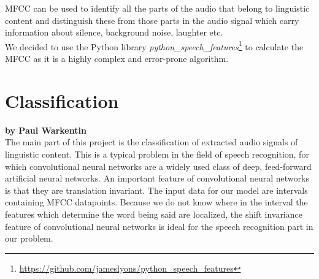 MFCC can be used to identify all the parts of the audio that belong to linguistic content and distinguish these from those parts in the audio signal which carry information about silence, background noise, laughter etc. \\

We decided to use the Python library \textit{python\_speech\_features}\footnote{\url{https://github.com/jameslyons/python_speech_features}} to calculate the MFCC as it is a highly complex and error-prone algorithm.

\section{Classification}

\textbf{by Paul Warkentin} \\

The main part of this project is the classification of extracted audio signals of linguistic content. This is a typical problem in the field of speech recognition, for which convolutional neural networks are a widely used class of deep, feed-forward artificial neural networks.
An important feature of convolutional neural networks is that they are translation invariant. The input data for our model are intervals containing MFCC datapoints. Because we do not know where in the interval the features which determine the word being said are localized, the shift invariance feature of convolutional neural networks is ideal for the speech recognition part in our problem.
